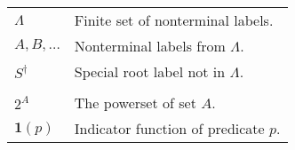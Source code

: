 \begin{table}[h]
\begin{tabular}{ll}
    $\Lambda$ & Finite set of nonterminal labels.  \\
    $A, B, \dots$ & Nonterminal labels from $\Lambda$.  \\
    $S^{\dagger}$ & Special root label not in $\Lambda$.  \\
    & \\

    $2^A$ & The powerset of set $A$.  \\
    $\mathbf{1}(p)$  & Indicator function of predicate $p$.  \\

  \end{tabular}

\end{table}

% 
